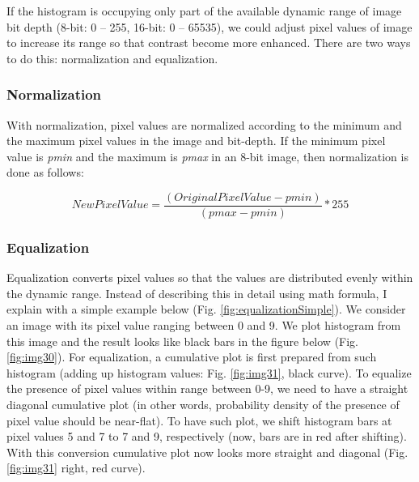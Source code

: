 If the histogram is occupying only part of the available dynamic range
of image bit depth (8-bit: 0 -- 255, 16-bit: 0 -- 65535), we could
adjust pixel values of image to increase its range so that contrast become more
enhanced. There are two ways to do this: normalization and
equalization. 

\subsubsection{Normalization}

With normalization, pixel values are normalized according to the
minimum and the maximum pixel values in the image and bit-depth. If the minimum pixel value is
\textit{pmin} and the maximum is \textit{pmax} in an 8-bit image, then normalization is done as follows:

\begin{equation*}
\mathit{NewPixelValue}=\frac{(\mathit{OriginalPixelValue}-\mathit{pmin})}{(\mathit{pmax}-\mathit{pmin})}\ast
255
\end{equation*}

\subsubsection{Equalization}

Equalization converts pixel values so that the values are distributed
evenly within the dynamic range. Instead of describing this in detail
using math formula, I explain with a simple example below (Fig. \ref{fig:equalizationSimple}). We consider an image with its pixel value ranging
between 0 and 9. We plot histogram from this image and the result looks
like black bars in the figure below (Fig. \ref{fig:img30}). For equalization, a cumulative
plot is first prepared from such histogram (adding up histogram values:
Fig. \ref{fig:img31}, black curve). To equalize the presence of pixel values
within range between 0-9, we need to have a straight diagonal
cumulative plot (in other words, probability density of the presence of
pixel value should be near-flat). To have such plot, we shift histogram
bars at pixel values 5 and 7 to 7 and 9, respectively (now, bars are in
red after shifting). With this conversion cumulative plot now looks
more straight and diagonal (Fig. \ref{fig:img31} right, red curve).


